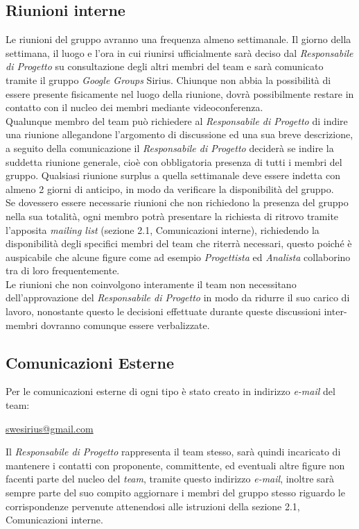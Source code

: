 \subsection{Riunioni interne}
Le riunioni del gruppo \gruppo avranno una frequenza almeno settimanale. Il giorno della settimana, il luogo e l'ora in cui riunirsi ufficialmente sarà deciso dal \textit{Responsabile di Progetto} su consultazione degli altri membri del team e sarà comunicato tramite il gruppo \textit{Google Groups} Sirius. Chiunque non abbia la possibilità di essere presente fisicamente nel luogo della riunione, dovrà possibilmente restare in contatto con il nucleo dei membri mediante videoconferenza.\\
Qualunque membro del team può richiedere al \textit{Responsabile di Progetto} di indire una riunione allegandone l'argomento di discussione ed una sua breve descrizione, a seguito della comunicazione il \textit{Responsabile di Progetto} deciderà se indire la suddetta riunione generale, cioè con obbligatoria presenza di tutti i membri del gruppo. Qualsiasi riunione surplus a quella settimanale deve essere indetta con almeno 2 giorni di anticipo, in modo da verificare la disponibilità del gruppo.\\
Se dovessero essere necessarie riunioni che non richiedono la presenza del gruppo nella sua totalità, ogni membro potrà presentare la richiesta di ritrovo tramite l'apposita \textit{mailing list} (sezione 2.1, Comunicazioni interne), richiedendo la disponibilità degli specifici membri del team che riterrà necessari, questo poiché è auspicabile che alcune figure come ad esempio \textit{Progettista} ed \textit{Analista} collaborino tra di loro frequentemente.\\
Le riunioni che non coinvolgono interamente il team non necessitano dell'approvazione del \textit{Responsabile di Progetto} in modo da ridurre il suo carico di lavoro, nonostante questo le decisioni effettuate durante queste discussioni inter-membri dovranno comunque essere verbalizzate.

\subsection{Comunicazioni Esterne}
Per le comunicazioni esterne di ogni tipo è stato creato in indirizzo \textit{e-mail} del team:
\begin{center}
\href{swesirius@gmail.com}{swesirius@gmail.com}
\end{center}

Il \textit{Responsabile di Progetto} rappresenta il team stesso, sarà quindi incaricato di mantenere i contatti con proponente, committente, ed eventuali altre figure non facenti parte del nucleo del \textit{team}, tramite questo indirizzo \textit{e-mail}, inoltre sarà sempre parte del suo compito aggiornare i membri del gruppo stesso riguardo le corrispondenze pervenute attenendosi alle istruzioni della sezione 2.1, Comunicazioni interne.

